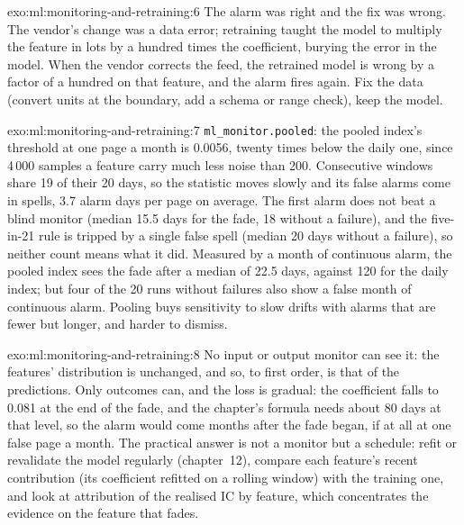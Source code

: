 \begin{solution}{exo:ml:monitoring-and-retraining:6}
The alarm was right and the fix was wrong. The vendor's change was a data error; retraining taught the model to multiply the
feature in lots by a hundred times the coefficient, burying the error in the model. When the vendor corrects the feed, the
retrained model is wrong by a factor of a hundred on that feature, and the alarm fires again. Fix the data (convert units at the
boundary, add a schema or range check), keep the model.
\end{solution}

\begin{solution}{exo:ml:monitoring-and-retraining:7}
\texttt{ml\_monitor.pooled}: the pooled index's threshold at one page a month is 0.0056, twenty times below the daily one, since
4\,000 samples a feature carry much less noise than 200. Consecutive windows share 19 of their 20 days, so the statistic moves
slowly and its false alarms come in spells, 3.7 alarm days per page on average. The first alarm does not beat a blind monitor
(median 15.5 days for the fade, 18 without a failure), and the five-in-21 rule is tripped by a single false spell (median 20
days without a failure), so neither count means what it did. Measured by a month of continuous alarm, the pooled index sees the
fade after a median of 22.5 days, against 120 for the daily index; but four of the 20 runs without failures also show a false
month of continuous alarm. Pooling buys sensitivity to slow drifts with alarms that are fewer but longer, and harder to dismiss.
\end{solution}

\begin{solution}{exo:ml:monitoring-and-retraining:8}
No input or output monitor can see it: the features' distribution is unchanged, and so, to first order, is that of the
predictions. Only outcomes can, and the loss is gradual: the coefficient falls to 0.081 at the end of the fade, and the chapter's
formula needs about 80 days at that level, so the alarm would come months after the fade began, if at all at one false page a
month. The practical answer is not a monitor but a schedule: refit or revalidate the model regularly (chapter~12), compare each
feature's recent contribution (its coefficient refitted on a rolling window) with the training one, and look at attribution of
the realised IC by feature, which concentrates the evidence on the feature that fades.
\end{solution}

